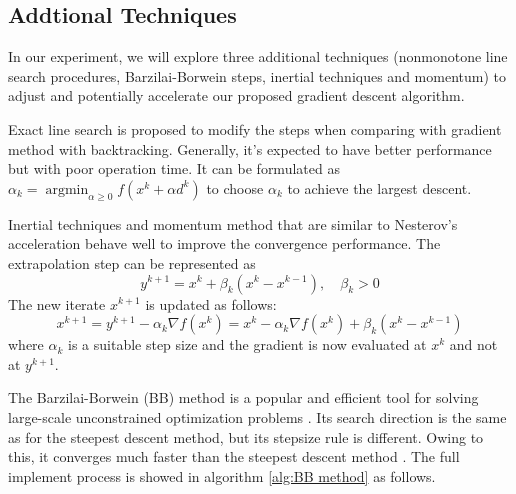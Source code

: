\subsection{Addtional Techniques}
In our experiment, we will explore three additional techniques (nonmonotone line search procedures, Barzilai-Borwein steps, inertial techniques and momentum) to adjust and potentially accelerate our proposed gradient descent algorithm. 

Exact line search is proposed to modify the steps when comparing with gradient method with backtracking. Generally, it's expected to have better performance but with poor operation time. It can be formulated as $\alpha_{k}=\operatorname{argmin}_{\alpha \geq 0} f\left(x^{k}+\alpha d^{k}\right)$ to choose $\alpha_{k}$ to achieve the largest descent. 

Inertial techniques and momentum method that are similar to Nesterov’s acceleration behave well to improve the convergence performance. The extrapolation step can be represented as 
\begin{equation}
y^{k+1}=x^{k}+\beta_{k}\left(x^{k}-x^{k-1}\right), \quad \beta_{k}>0
\end{equation}
The new iterate $x^{k+1}$ is updated as follows:
\begin{equation}
x^{k+1}=y^{k+1}-\alpha_{k} \nabla f\left(x^{k}\right)=x^{k}-\alpha_{k} \nabla f\left(x^{k}\right)+\beta_{k}\left(x^{k}-x^{k-1}\right)
\end{equation}
where $\alpha_{k}$ is a suitable step size and the gradient is now evaluated at $x^{k}$ and not at $y^{k+1} $.

The Barzilai-Borwein (BB) method is a popular and efficient tool for solving large-scale unconstrained optimization problems \cite{raydan1997barzilai}. Its search direction is the same as for the steepest descent method, but its stepsize rule is different. Owing to this, it converges much faster than the steepest descent method \cite{burdakov2019stabilized}. The full implement process is showed in algorithm \ref{alg:BB method} as follows.

